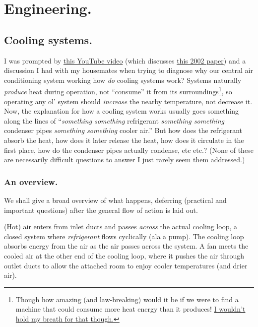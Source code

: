 \documentclass[../main/main.tex]{subfiles}
\begin{document}
\chapter{Engineering.}

\section{Cooling systems.}

I was prompted by \href{https://www.youtube.com/watch?v=9CodKUa4F2o}
{this YouTube video}
(which discusses \href{https://www.ncbi.nlm.nih.gov/pmc/articles/PMC3062901/}
{this 2002 paper})
and a discussion I had with my housemates when trying
to diagnose why our central air conditioning system
working \textemdash{}
how \emph{do} cooling systems work?
Systems naturally \emph{produce} heat during operation,
not ``consume'' it from its surroundings\footnote{
    Though how amazing (and law-breaking)
    would it be if we were to find a machine that
    could consume more heat energy than it produces!
    \href{https://en.wikipedia.org/wiki/Perpetual_motion\#Basic_principles}
    {I wouldn't hold my breath for that though.}
}, so operating any ol' system should \emph{increase}
the nearby temperature, not decrease it.
Now, the explanation for how a cooling system works
usually goes something along the lines of
``\textit{something something} refrigerant 
\textit{something something} condenser pipes
\textit{something something} cooler air.''
But how does the refrigerant absorb the heat,
how does it later release the heat,
how does it circulate in the first place,
how do the condenser pipes actually condense, etc etc.?
(None of these are necessarily difficult questions to answer
\textemdash{} I just rarely seem them addressed.)

\subsection{An overview.}

We shall give a broad overview of what happens, deferring
(practical and important questions) after the general
flow of action is laid out.\par

(Hot) air enters from inlet ducts 
and passes \emph{across}
the actual cooling loop, a closed system where \emph{refrigerant}
flows cyclically (ala a pump).
The cooling loop absorbs energy from the air as the air passes 
across the system. A fan meets the cooled air at the other end
of the cooling loop, where it pushes the air through outlet ducts
to allow the attached room to enjoy cooler temperatures
(and drier air).
\end{document}
